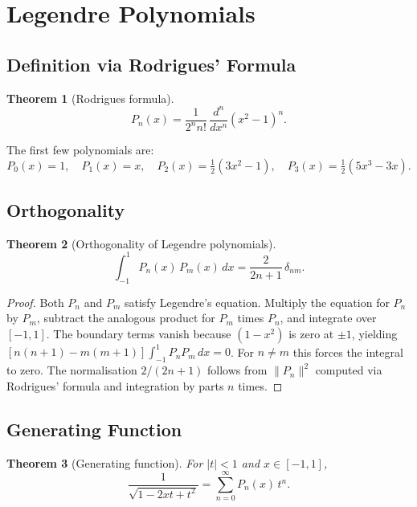 \documentclass[12pt,a4paper]{amsart}
\newtheorem{theorem}{Theorem}[section]
\theoremstyle{definition}
\begin{document}
\section{Legendre Polynomials}
\label{sec:legendre}

\subsection{Definition via Rodrigues' Formula}

\begin{theorem}[Rodrigues formula]\label{thm:rodrigues}
\[
  P_n(x) = \frac{1}{2^n n!}\,\frac{d^n}{dx^n}(x^2-1)^n.
\]
\end{theorem}

The first few polynomials are:
\[
  P_0(x)=1,\quad P_1(x)=x,\quad P_2(x)=\tfrac{1}{2}(3x^2-1),\quad
  P_3(x)=\tfrac{1}{2}(5x^3-3x).
\]

\subsection{Orthogonality}

\begin{theorem}[Orthogonality of Legendre polynomials]\label{thm:legendre_ortho}
\[
  \int_{-1}^1 P_n(x)\,P_m(x)\,dx = \frac{2}{2n+1}\,\delta_{nm}.
\]
\end{theorem}

\begin{proof}
Both \(P_n\) and \(P_m\) satisfy Legendre's equation.  Multiply the equation for \(P_n\)
by \(P_m\), subtract the analogous product for \(P_m\) times \(P_n\), and integrate over
\([-1,1]\).  The boundary terms vanish because \((1-x^2)\) is zero at \(\pm 1\), yielding
\([n(n+1)-m(m+1)]\int_{-1}^1 P_n P_m\,dx = 0\).  For \(n \neq m\) this forces the
integral to zero.  The normalisation \(2/(2n+1)\) follows from \(\|P_n\|^2\) computed via
Rodrigues' formula and integration by parts \(n\) times.
\end{proof}

\subsection{Generating Function}

\begin{theorem}[Generating function]
For \(|t| < 1\) and \(x \in [-1,1]\),
\[
  \frac{1}{\sqrt{1-2xt+t^2}} = \sum_{n=0}^\infty P_n(x)\,t^n.
\]
\end{theorem}
\end{document}
